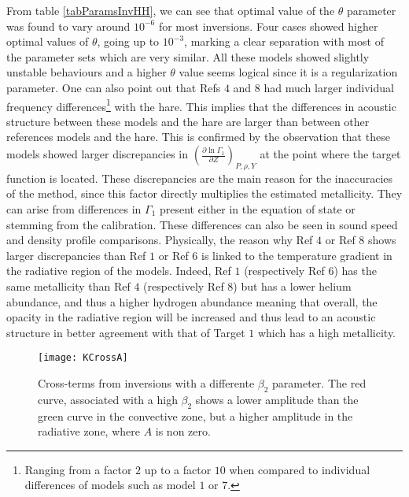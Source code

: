 \documentclass[a4paper,fleqn,usenatbib]{mnras}
\begin{document}
From table \ref{tabParamsInvHH}, we can see that optimal value of the $\theta$ parameter was found to vary around $10^{-6}$ for most inversions. Four cases showed higher optimal values of $\theta$, going up to $10^{-3}$, marking a clear separation with most of the parameter sets which are very similar. All these models showed slightly unstable behaviours and a higher $\theta$ value seems logical since it is a regularization parameter. One can also point out that Refs $4$ and $8$ had much larger individual frequency differences\footnote{Ranging from a factor $2$ up to a factor $10$ when compared to individual differences of models such as model $1$ or $7$.} with the hare. This implies that the differences in acoustic structure between these models and the hare are larger than between other references models and the hare. This is confirmed by the observation that these models showed larger discrepancies in $\left(\frac{\partial \ln \Gamma_{1}}{\partial Z}\right)_{P,\rho,Y}$ at the point where the target function is located. These discrepancies are the main reason for the inaccuracies of the method, since this factor directly multiplies the estimated metallicity. They can arise from differences in $\Gamma_{1}$ present either in the equation of state or stemming from the calibration. These differences can also be seen in sound speed and density profile comparisons. Physically, the reason why Ref $4$ or Ref $8$ shows larger discrepancies than Ref $1$ or Ref $6$ is linked to the temperature gradient in the radiative region of the models. Indeed, Ref $1$ (respectively Ref $6$) has the same metallicity than Ref $4$ (respectively Ref $8$) but has a lower helium abundance, and thus a higher hydrogen abundance meaning that overall, the opacity in the radiative region will be increased and thus lead to an acoustic structure in better agreement with that of Target $1$ which has a high metallicity.


 \begin{figure*}
	\centering
		\texttt{[image: KCrossA]}
	\caption{Cross-terms from inversions with a differente $\beta_{2}$ parameter. The red curve, associated with a high $\beta_{2}$ shows a lower amplitude than the green curve in the convective zone, but a higher amplitude in the radiative zone, where $A$ is non zero.}
		\label{figCrossA}
\end{figure*} 
\end{document}
